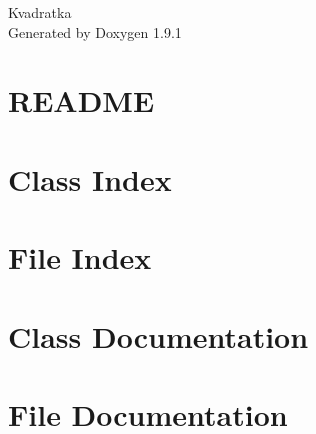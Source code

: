 \let\mypdfximage\pdfximage\def\pdfximage{\immediate\mypdfximage}\documentclass[twoside]{book}
\newcommand{\+}{\discretionary{\mbox{\scriptsize$\hookleftarrow$}}{}{}}
\newcommand{\clearemptydoublepage}{%
  \newpage{\pagestyle{empty}\cleardoublepage}%
}
\begin{document}
\raggedbottom

\hypersetup{pageanchor=false,
             bookmarksnumbered=true,
             pdfencoding=unicode
            }
\begin{titlepage}
\vspace*{7cm}
\begin{center}%
{\Large Kvadratka }\\
\vspace*{1cm}
{\large Generated by Doxygen 1.9.1}\\
\end{center}
\end{titlepage}
\clearemptydoublepage
{}
\tableofcontents
\clearemptydoublepage
{}
\hypersetup{pageanchor=true}

\chapter{README}
\label{md__r_e_a_d_m_e}

\chapter{Class Index}

\chapter{File Index}

\chapter{Class Documentation}


\chapter{File Documentation}








\backmatter
\newpage
{}
\clearemptydoublepage
{}
\printindex
\end{document}
